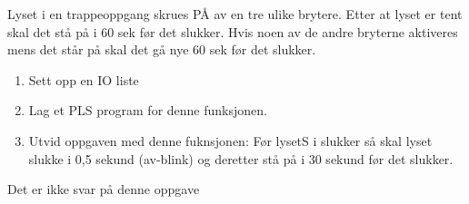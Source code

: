 


Lyset i en trappeoppgang skrues PÅ av en tre ulike brytere. Etter
at lyset er tent skal det stå på i 60 sek før det slukker. Hvis noen
av de andre bryterne aktiveres mens det står på skal det gå nye 60
sek før det slukker.
\begin{enumerate}
\item Sett opp en IO liste
\item Lag et PLS program for denne funksjonen.
\item Utvid oppgaven med denne fuknsjonen: Før lysetS i slukker så skal
lyset slukke i 0,5 sekund (av-blink) og deretter stå på i 30 sekund
før det slukker.
\end{enumerate}
\vskip 10pt






Det er ikke svar på denne oppgave












